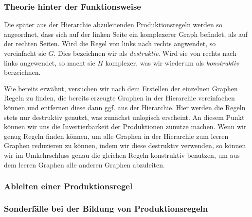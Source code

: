 \subsubsection{Theorie hinter der Funktionsweise}
Die später aus der Hierarchie abzuleitenden Produktionsregeln werden so angeordnet, dass sich auf der linken Seite ein komplexerer Graph befindet,
als auf der rechten Seiten. Wird die Regel von links nach rechts angwendet, so vereinfacht sie \(G\). Dies bezeichnen wir als \textit{destruktiv}.
Wird sie von rechts nach links angewendet, so macht sie \(H\) komplexer, was wir wiederum als \textit{konstruktiv} berzeichnen.

Wie bereits erwähnt, versuchen wir nach dem Erstellen der einzelnen Graphen Regeln zu finden, die bereits erzeugte Graphen in der Hierarchie
vereinfachen können und entfernen diese dann ggf. aus der Hierarchie. Hier werden die Regeln stets nur destruktiv genutzt, was zunächst unlogisch
erscheint. An diesem Punkt können wir uns die Invertierbarkeit der Produktionen zunutze machen. Wenn wir genug Regeln finden können, um alle Graphen
in der Hierarchie zum leeren Graphen reduzieren zu können, indem wir diese destruktiv verwenden, so können wir im Umkehrschluss genau die gleichen
Regeln konstruktiv benutzen, um aus dem leeren Graphen alle anderen Graphen abzuleiten.

\subsubsection{Ableiten einer Produktionsregel}

\subsubsection{Sonderfälle bei der Bildung von Produktionsregeln}

